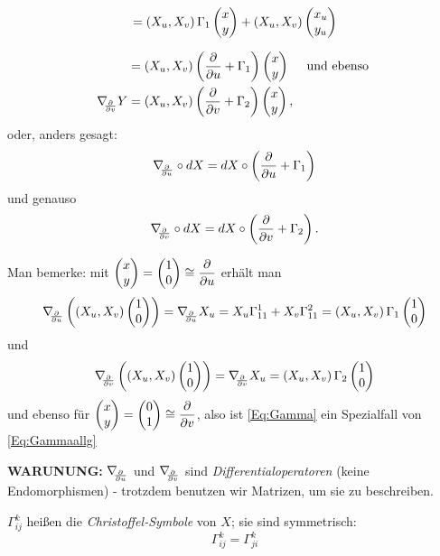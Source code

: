 		\[ = \left( X_u, X_v \right) \Gamma_1\begin{pmatrix} x \\ y \end{pmatrix} + \left( X_u, X_v \right) \begin{pmatrix} x_u \\ y_u \end{pmatrix} \] 
		
		\begin{equation} \label{Eq:Gammaallg}
		\begin{split}
			&= \left( X_u, X_v \right) \left( \dfrac{\partial}{\partial u} +\Gamma_1 \right) \begin{pmatrix} x \\ y \end{pmatrix}  \quad \text{ und ebenso }
		 \\ 
		 \nabla_{\!\!{\partial\over \partial v}}Y &= \left( X_u, X_v \right) \left( \dfrac{\partial}{\partial v} +\Gamma_2 \right) \begin{pmatrix} x \\ y \end{pmatrix}, 
		 \end{split}
		\end{equation} 
	oder, anders gesagt:
		\[ \nabla_{\!\!{\partial\over \partial u}} \circ dX = dX \circ \left( \dfrac{\partial}{\partial u} + \Gamma_1 \right)  \]
	und genauso
		\[  \nabla_{\!\!{\partial\over \partial v}} \circ dX = dX \circ \left( \dfrac{\partial}{\partial v} + \Gamma_2 \right).   \]	
	
	Man bemerke: mit $ \begin{pmatrix} x \\ y \end{pmatrix} = \begin{pmatrix} 1 \\ 0 \end{pmatrix} \cong \dfrac{\partial}{\partial u} $ erhält man
		\[ \nabla_{\!\!{\partial\over \partial u}}\left( \left( X_u,X_v \right) \begin{pmatrix} 1 \\ 0 \end{pmatrix} \right) = \nabla_{\!\!{\partial\over \partial u}}X_u = X_u \Gamma_{11}^1 + X_v\Gamma_{11}^2 = \left( X_u,X_v \right) \Gamma_1\begin{pmatrix} 1 \\ 0 \end{pmatrix}   \] 
	und
		\[ \nabla_{\!\!{\partial\over \partial v}} \left( \left( X_u,X_v \right) \begin{pmatrix} 1 \\ 0 \end{pmatrix} \right) = \nabla_{\!\!{\partial\over \partial v}}X_u = \left( X_u,X_v \right) \Gamma_2\begin{pmatrix} 1 \\ 0 \end{pmatrix} \]
	und ebenso für  $ \begin{pmatrix} x \\ y \end{pmatrix} = \begin{pmatrix} 0 \\ 1 \end{pmatrix} \cong \dfrac{\partial}{\partial v} $, also ist \ref*{Eq:Gamma} ein Spezialfall von \ref*{Eq:Gammaallg}
	
	\begin{remark}
		\textbf{WARUNUNG:} $ \nabla_{\!\!{\partial\over \partial u}} $ und $ \nabla_{\!\!{\partial\over \partial v}} $ sind \emph{Differentialoperatoren} (keine Endomorphismen) - trotzdem benutzen wir Matrizen, um sie zu beschreiben.
	\end{remark}

\begin{lemma, definition}
	
	$\Gamma_{ij}^k$ heißen die \emph{Christoffel-Symbole} von $ X $; sie sind symmetrisch: 
		\[ \Gamma_{ij}^k = \Gamma_{ji}^k \]
	
\end{lemma, definition}

